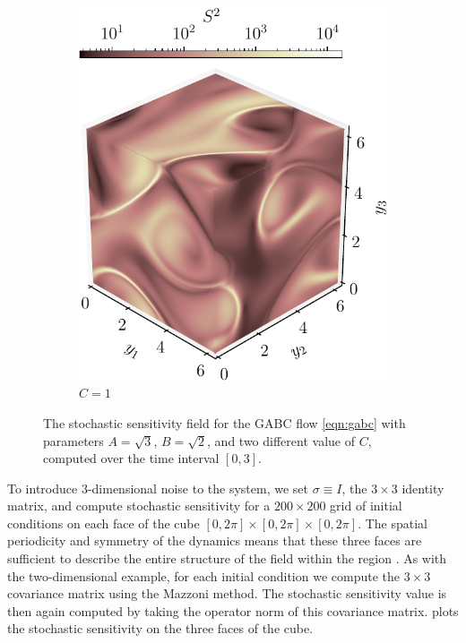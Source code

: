 \begin{figure}
\begin{subfigure}[t]{0.49\textwidth}
		\includegraphics[width=\textwidth]{chp04_paper_numerics/figures/gabc/S2_box_1.7320508075688772_1.4142135623730951_1_cropped}
		\caption{\(C = 1\)}
		\label{fig:gabc_S2_1}
	\end{subfigure}
	\caption{The stochastic sensitivity field for the GABC flow \cref{eqn:gabc} with parameters \(A = \sqrt{3}\), \(B = \sqrt{2}\), and two different value of \(C\), computed over the time interval \([0,3]\).}
	\label{fig:gabc_S2}
\end{figure}

To introduce 3-dimensional noise to the system, we set \(\sigma \equiv I\), the \(3 \times 3\) identity matrix, and compute stochastic sensitivity for a \(200\times 200\) grid of initial conditions on each face of the cube \([0,2\pi] \times [0,2\pi] \times [0,2\pi]\).
The spatial periodicity and symmetry of the dynamics means that these three faces are sufficient to describe the entire structure of the field within the region \citep{DombreEtAl_1986_ChaoticStreamlinesABC}.
As with the two-dimensional example, for each initial condition we compute the \(3 \times 3\) covariance matrix using the Mazzoni method.
The stochastic sensitivity value is then again computed by taking the operator norm of this covariance matrix.
 plots the stochastic sensitivity on the three faces of the cube.

